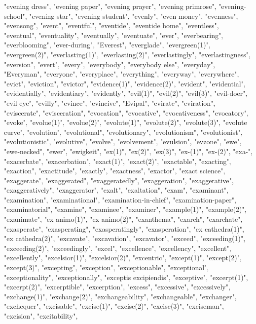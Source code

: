 "evening dress",
"evening paper",
"evening prayer",
"evening primrose",
"evening-school",
"evening star",
"evening student",
"evenly",
"even money",
"evenness",
"evensong",
"event",
"eventful",
"eventide",
"eventide home",
"eventless",
"eventual",
"eventuality",
"eventually",
"eventuate",
"ever",
"everbearing",
"everblooming",
"ever-during",
"Everest",
"everglade",
"evergreen(1)",
"evergreen(2)",
"everlasting(1)",
"everlasting(2)",
"everlastingly",
"everlastingness",
"eversion",
"evert",
"every",
"everybody",
"everybody else",
"everyday",
"Everyman",
"everyone",
"everyplace",
"everything",
"everyway",
"everywhere",
"evict",
"eviction",
"evictor",
"evidence(1)",
"evidence(2)",
"evident",
"evidential",
"evidentially",
"evidentiary",
"evidently",
"evil(1)",
"evil(2)",
"evil(3)",
"evil-doer",
"evil eye",
"evilly",
"evince",
"evincive",
"Evipal",
"evirate",
"eviration",
"eviscerate",
"evisceration",
"evocation",
"evocative",
"evocativeness",
"evocatory",
"evoke",
"evolue(1)",
"evolue(2)",
"evolute(1)",
"evolute(2)",
"evolute(3)",
"evolute curve",
"evolution",
"evolutional",
"evolutionary",
"evolutionism",
"evolutionist",
"evolutionistic",
"evolutive",
"evolve",
"evolvement",
"evulsion",
"evzone",
"ewe",
"ewe-necked",
"ewer",
"ewigkeit",
"ex(1)",
"ex(2)",
"ex(3)",
"ex-(1)",
"ex-(2)",
"exa-",
"exacerbate",
"exacerbation",
"exact(1)",
"exact(2)",
"exactable",
"exacting",
"exaction",
"exactitude",
"exactly",
"exactness",
"exactor",
"exact science",
"exaggerate",
"exaggerated",
"exaggeratedly",
"exaggeration",
"exaggerative",
"exaggeratively",
"exaggerator",
"exalt",
"exaltation",
"exam",
"examinant",
"examination",
"examinational",
"examination-in-chief",
"examination-paper",
"examinatorial",
"examine",
"examinee",
"examiner",
"example(1)",
"example(2)",
"exanimate",
"ex animo(1)",
"ex animo(2)",
"exanthema",
"exarch",
"exarchate",
"exasperate",
"exasperating",
"exasperatingly",
"exasperation",
"ex cathedra(1)",
"ex cathedra(2)",
"excavate",
"excavation",
"excavator",
"exceed",
"exceeding(1)",
"exceeding(2)",
"exceedingly",
"excel",
"excellence",
"excellency",
"excellent",
"excellently",
"excelsior(1)",
"excelsior(2)",
"excentric",
"except(1)",
"except(2)",
"except(3)",
"excepting",
"exception",
"exceptionable",
"exceptional",
"exceptionality",
"exceptionally",
"exceptis excipiendis",
"exceptive",
"excerpt(1)",
"excerpt(2)",
"excerptible",
"excerption",
"excess",
"excessive",
"excessively",
"exchange(1)",
"exchange(2)",
"exchangeability",
"exchangeable",
"exchanger",
"exchequer",
"excisable",
"excise(1)",
"excise(2)",
"excise(3)",
"exciseman",
"excision",
"excitability",
